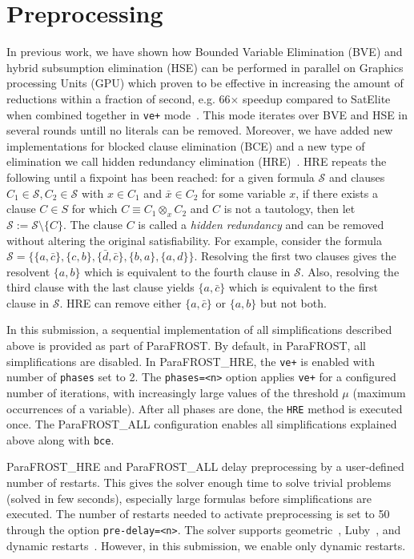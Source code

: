 \documentclass[conference]{IEEEtran}
\newcommand{\parafrost}{ParaFROST\xspace}
\newcommand{\parafrostHRE}{ParaFROST\_HRE\xspace}
\newcommand{\parafrostALL}{ParaFROST\_ALL\xspace}
\begin{document}
\section{Preprocessing}
In previous work, we have shown how Bounded Variable Elimination (BVE) and hybrid subsumption elimination (HSE) can be performed in parallel on Graphics processing Units (GPU) which proven to be effective in increasing the amount of reductions within a fraction of second, e.g. 66$\times$ speedup compared to SatElite when combined together in \texttt{ve+} mode~\cite{sigmaTacas}. This mode iterates over BVE and HSE in several rounds untill no literals can be removed. Moreover, we
have added new implementations for blocked clause elimination (BCE) and a new type
of elimination we call hidden redundancy elimination (HRE)~\cite{sigmaIfm}. HRE repeats the following until a fixpoint has been reached: for a given formula $\mathcal{S}$ and clauses $C_1\in\mathcal{S},C_2\in\mathcal{S}$ with $x\in C_1$ and $\bar{x}\in C_2$ for some variable $x$, if there exists a clause $C\in S$ for which $C\equiv C_1 \otimes_{x} C_2$ and $C$ is not a tautology, then let $\mathcal{S} := \mathcal{S} \setminus \{C\}$. The clause $C$ is called a \emph{hidden redundancy} and can be removed without altering the original satisfiability.
For example, consider the formula $\mathcal{S}=\{\{a,\bar{c}\},\{c,b\},\{\bar{d},\bar{c}\},\{b, a\},\{a,d\}\}$.
Resolving the first two clauses gives the resolvent $\{a,b\}$ which is equivalent to the fourth clause in $\mathcal{S}$. Also, resolving the third clause with the last clause yields $\{a,\bar{c}\}$ which is equivalent to the first clause in $\mathcal{S}$. HRE can remove either $\{a,\bar{c}\}$ or $\{a,b\}$ but not both.

In this submission, a sequential implementation of all simplifications described above is provided as part of \parafrost. By default, in \parafrost, all simplifications are disabled. 
In \parafrostHRE, the \texttt{ve+} is enabled with number of \texttt{phases} set to 2. The \texttt{phases=<n>} option applies \texttt{ve+} for a configured number of iterations, with increasingly large values of the threshold $\mu$ (maximum occurrences of a variable). After all phases are done, the \texttt{HRE} method is executed once. The \parafrostALL configuration enables all simplifications explained above along with \texttt{bce}.

\parafrostHRE and \parafrostALL delay preprocessing by a user-defined number of restarts. This gives the solver enough time to solve trivial problems (solved in few seconds), especially large formulas before simplifications are executed. The number of restarts needed to activate preprocessing is set to 50 through the option \texttt{pre-delay=<n>}. The solver supports geometric~\cite{geoRestart}, Luby~\cite{minisat}, and dynamic restarts~\cite{dynamicRestarts}. However, in this submission, we enable only dynamic restarts.
%
%
\end{document}
